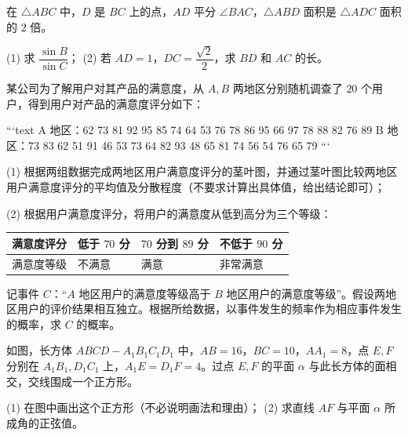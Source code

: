 \begin{question}
在 $\triangle ABC$ 中，$D$ 是 $BC$ 上的点，$AD$ 平分 $\angle BAC$，$\triangle ABD$ 面积是 $\triangle ADC$ 面积的 $2$ 倍。

(1) 求 $\dfrac{\sin B}{\sin C}$；  
(2) 若 $AD=1$，$DC=\dfrac{\sqrt2}{2}$，求 $BD$ 和 $AC$ 的长。

\Needspace{0.4\textheight}
\end{question}
\begin{question}
某公司为了解用户对其产品的满意度，从 $A,B$ 两地区分别随机调查了 $20$ 个用户，得到用户对产品的满意度评分如下：

```text
A 地区：62  73  81  92  95  85  74  64  53  76
        78  86  95  66  97  78  88  82  76  89
B 地区：73  83  62  51  91  46  53  73  64  82
        93  48  65  81  74  56  54  76  65  79
```

(1) 根据两组数据完成两地区用户满意度评分的茎叶图，并通过茎叶图比较两地区用户满意度评分的平均值及分散程度（不要求计算出具体值，给出结论即可）；
\nopagebreak[4]
\begin{center}\end{center}
\nopagebreak[4]
(2) 根据用户满意度评分，将用户的满意度从低到高分为三个等级：

\begin{center}
\begin{tabular}{llll}
\toprule
满意度评分 & 低于 $70$ 分 & $70$ 分到 $89$ 分 & 不低于 $90$ 分 \\
\midrule
满意度等级 & 不满意 & 满意 & 非常满意 \\
\bottomrule
\end{tabular}
\end{center}

记事件 $C$：“$A$ 地区用户的满意度等级高于 $B$ 地区用户的满意度等级”。假设两地区用户的评价结果相互独立。根据所给数据，以事件发生的频率作为相应事件发生的概率，求 $C$ 的概率。

\Needspace{0.4\textheight}
\end{question}
\begin{question}
如图，长方体 $ABCD-A_1B_1C_1D_1$ 中，$AB=16$，$BC=10$，$AA_1=8$，点 $E,F$ 分别在 $A_1B_1,D_1C_1$ 上，$A_1E=D_1F=4$。过点 $E,F$ 的平面 $\alpha$ 与此长方体的面相交，交线围成一个正方形。

(1) 在图中画出这个正方形（不必说明画法和理由）；  
(2) 求直线 $AF$ 与平面 $\alpha$ 所成角的正弦值。
\nopagebreak[4]
\begin{center}\end{center}
\nopagebreak[4]
\end{question}
